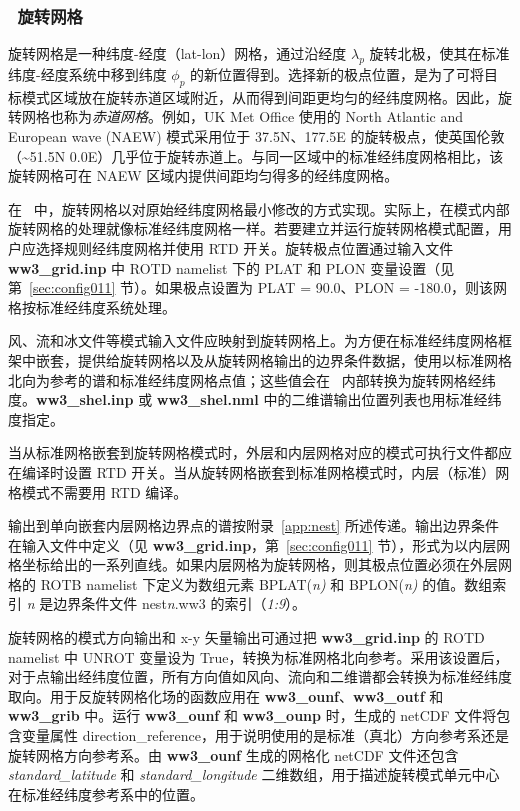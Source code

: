 \vssub
\subsubsection{~旋转网格} \label{sub:num_space_rotagrid}

\noindent
旋转网格是一种纬度-经度（lat-lon）网格，通过沿经度 $\lambda_{p}$ 旋转北极，使其在标准纬度-经度系统中移到纬度 $\phi_{p}$ 的新位置得到。选择新的极点位置，是为了可将目标模式区域放在旋转赤道区域附近，从而得到间距更均匀的经纬度网格。因此，旋转网格也称为\emph{赤道网格}。例如，UK Met Office 使用的 North Atlantic and European wave (NAEW) 模式采用位于 37.5N、177.5E 的旋转极点，使英国伦敦（\textasciitilde{}51.5N 0.0E）几乎位于旋转赤道上。与同一区域中的标准经纬度网格相比，该旋转网格可在 NAEW 区域内提供间距均匀得多的经纬度网格。

在 \ws\ 中，旋转网格以对原始经纬度网格最小修改的方式实现。实际上，在模式内部旋转网格的处理就像标准经纬度网格一样。若要建立并运行旋转网格模式配置，用户应选择规则经纬度网格并使用 {\code RTD} 开关。旋转极点位置通过输入文件 {\bf ww3\_grid.inp} 中 {\code ROTD} namelist 下的 {\code PLAT} 和 {\code PLON} 变量设置（见第~\ref{sec:config011} 节）。如果极点设置为 {\code PLAT = 90.0}、{\code PLON = -180.0}，则该网格按标准经纬度系统处理。

风、流和冰文件等模式输入文件应映射到旋转网格上。为方便在标准经纬度网格框架中嵌套，提供给旋转网格以及从旋转网格输出的边界条件数据，使用以标准网格北向为参考的谱和标准经纬度网格点值；这些值会在 \ws\ 内部转换为旋转网格经纬度。{\bf ww3\_shel.inp} 或 {\bf ww3\_shel.nml} 中的二维谱输出位置列表也用标准经纬度指定。

当从标准网格嵌套到旋转网格模式时，外层和内层网格对应的模式可执行文件都应在编译时设置 {\code RTD} 开关。当从旋转网格嵌套到标准网格模式时，内层（标准）网格模式不需要用 {\code RTD} 编译。

输出到单向嵌套内层网格边界点的谱按附录~\ref{app:nest} 所述传递。输出边界条件在输入文件中定义（见 {\bf ww3\_grid.inp}，第~\ref{sec:config011} 节），形式为以内层网格坐标给出的一系列直线。如果内层网格为旋转网格，则其极点位置必须在外层网格的 {\code ROTB} namelist 下定义为数组元素 {\code BPLAT(\sl{n})} 和 {\code BPLON(\sl{n})} 的值。数组索引 {\sl{n}} 是边界条件文件 {\file nest{\sl{n}}.ww3} 的索引（{\sl{1:9}}）。

旋转网格的模式方向输出和 x-y 矢量输出可通过把 {\bf ww3\_grid.inp} 的 ROTD namelist 中 UNROT 变量设为 True，转换为标准网格北向参考。采用该设置后，对于点输出经纬度位置，所有方向值如风向、流向和二维谱都会转换为标准经纬度取向。用于反旋转网格化场的函数应用在 {\bf ww3\_ounf}、{\bf ww3\_outf} 和 {\bf ww3\_grib} 中。运行 {\bf ww3\_ounf} 和 {\bf ww3\_ounp} 时，生成的 netCDF 文件将包含变量属性 direction\_reference，用于说明使用的是标准（真北）方向参考系还是旋转网格方向参考系。由 {\bf ww3\_ounf} 生成的网格化 netCDF 文件还包含 \emph{standard\_latitude} 和 \emph{standard\_longitude} 二维数组，用于描述旋转模式单元中心在标准经纬度参考系中的位置。


